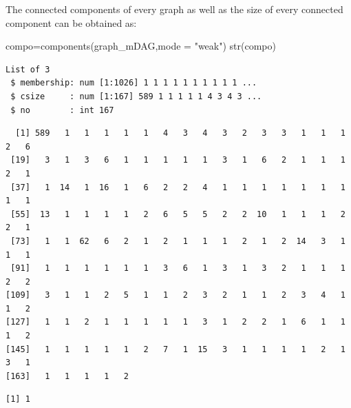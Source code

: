 \documentclass[
  letterpaper,
  DIV=11,
  numbers=noendperiod]{scrreprt}
\newenvironment{Shaded}{}{}
\newcommand{\AttributeTok}[1]{\textcolor[rgb]{0.78,0.47,0.87}{#1}}
\newcommand{\FunctionTok}[1]{\textcolor[rgb]{0.38,0.69,0.94}{#1}}
\newcommand{\NormalTok}[1]{\textcolor[rgb]{0.67,0.70,0.75}{#1}}
\newcommand{\OtherTok}[1]{\textcolor[rgb]{0.15,0.68,0.38}{#1}}
\newcommand{\SpecialCharTok}[1]{\textcolor[rgb]{0.34,0.71,0.76}{#1}}
\newcommand{\StringTok}[1]{\textcolor[rgb]{0.60,0.76,0.47}{#1}}
\begin{document}
The connected components of every graph as well as the size of every
connected component can be obtained as:

\begin{Shaded}
\begin{Highlighting}[]
\NormalTok{compo}\OtherTok{=}\FunctionTok{components}\NormalTok{(graph\_mDAG,}\AttributeTok{mode =} \StringTok{"weak"}\NormalTok{)}
\FunctionTok{str}\NormalTok{(compo)}
\end{Highlighting}
\end{Shaded}

\begin{verbatim}
List of 3
 $ membership: num [1:1026] 1 1 1 1 1 1 1 1 1 1 ...
 $ csize     : num [1:167] 589 1 1 1 1 1 4 3 4 3 ...
 $ no        : int 167
\end{verbatim}

\begin{Shaded}
\end{Shaded}

\begin{verbatim}
  [1] 589   1   1   1   1   1   4   3   4   3   2   3   3   1   1   1   2   6
 [19]   3   1   3   6   1   1   1   1   1   3   1   6   2   1   1   1   2   1
 [37]   1  14   1  16   1   6   2   2   4   1   1   1   1   1   1   1   1   1
 [55]  13   1   1   1   1   2   6   5   5   2   2  10   1   1   1   2   2   1
 [73]   1   1  62   6   2   1   2   1   1   1   2   1   2  14   3   1   1   1
 [91]   1   1   1   1   1   1   3   6   1   3   1   3   2   1   1   1   2   2
[109]   3   1   1   2   5   1   1   2   3   2   1   1   2   3   4   1   1   2
[127]   1   1   2   1   1   1   1   1   3   1   2   2   1   6   1   1   1   2
[145]   1   1   1   1   1   2   7   1  15   3   1   1   1   1   2   1   3   1
[163]   1   1   1   1   2
\end{verbatim}

\begin{Shaded}
\end{Shaded}

\begin{verbatim}
[1] 1
\end{verbatim}
\end{document}
